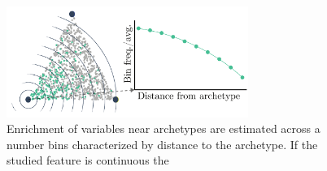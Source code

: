 \begin{figure}
	\centering
	\includegraphics[width=0.7\textwidth]{figures/enrichmentExample}
	\caption{\label{fig:enrichmentExample} Enrichment of variables near archetypes are estimated across a number bins characterized by distance to the archetype. If the studied feature is continuous the }
\end{figure}